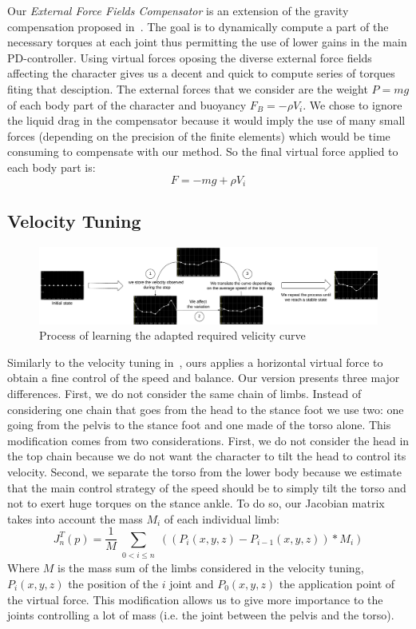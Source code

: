 \documentclass[conference]{acmsiggraph}
\begin{document}
Our \textit{External Force Fields Compensator} is an extension of the gravity compensation proposed in~\cite{coros2010generalized}. The goal is to dynamically compute a part of the necessary torques at each joint thus permitting the use of lower gains in the main PD-controller. Using virtual forces oposing the diverse external force fields affecting the character gives us a decent and quick to compute series of torques fiting that desciption.
The external forces that we consider are the weight $P=mg$ of each body part of the character and buoyancy $F_B=-\rho V_i$. We chose to ignore the liquid drag in the compensator because it would imply the use of many small forces (depending on the precision of the finite elements)  which would be time consuming to compensate with our method.
So the final virtual force applied to each body part is:
$$
F=-mg+\rho V_i
$$

\subsection{Velocity Tuning}
\label{sec:speed_virt_force}

\begin{figure}[t]
\centering
\includegraphics[scale=0.35]{images/speed_curve_learner.pdf}
\caption{Process of learning the adapted required velicity curve}
\label{fig:speed_curve_learner}
\end{figure}

Similarly to the velocity tuning in~\cite{coros2010generalized}, ours applies a horizontal virtual force to obtain a fine control of the speed and balance. Our version presents three major differences. First, we do not consider the same chain of limbs. Instead of considering one chain that goes from the head to the stance foot we use two: one going from the pelvis to the stance foot and one made of the torso alone. This modification comes from two considerations. First, we do not consider the head in the top chain because we do not want the character to tilt the head to control its velocity. Second, we separate the torso from the lower body because we estimate that the main control strategy of the speed should be to simply tilt the torso and not to exert huge torques on the stance ankle. To do so, our Jacobian matrix takes into account the mass $M_i$ of each individual limb:
$$
J_n ^T (p)=\frac{1}{M}\sum_{\substack{0<i\leq n}} ((P_i(x,y,z)-P_{i-1}(x,y,z))*M_i)
$$
Where $M$ is the mass sum of the limbs considered in the velocity tuning, $P_i(x,y,z)$ the position of the $i$ joint and $P_0(x,y,z)$ the application point of the virtual force. This modification allows us to give more importance to the joints controlling a lot of mass (i.e. the joint between the pelvis and the torso).
\end{document}
